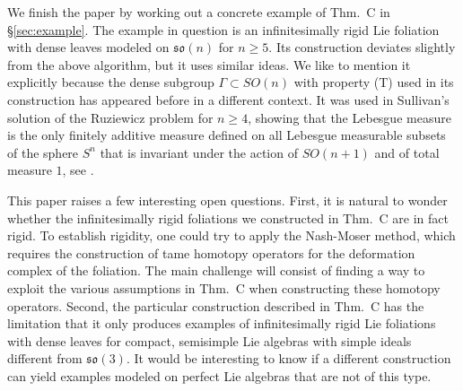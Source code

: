 \documentclass[11pt, letterpaper, oneside,reqno]{amsart}
\theoremstyle{plain}
\theoremstyle{underline}
\theoremstyle{definition}
\theoremstyle{remark}
\begin{document}
	\vspace{0.2cm}
	
	We finish the paper by working out a concrete example of Thm.~C in \S\ref{sec:example}. The example in question is an infinitesimally rigid Lie foliation with dense leaves modeled on $\mathfrak{so}(n)$ for $n\geq 5$. Its construction deviates slightly from the above algorithm, but it uses similar ideas. We like to mention it explicitly because the dense subgroup $\Gamma\subset SO(n)$ with property (T) used in its construction has appeared before in a different context. It was used in Sullivan's solution of the Ruziewicz problem for $n\geq 4$, showing that the Lebesgue measure is the only finitely additive measure defined on all Lebesgue measurable subsets of the sphere $S^{n}$ that is invariant under the action of $SO(n+1)$ and of total measure $1$, see \cite[\S~3.4]{Lubotzky}.
	
	\vspace{0.2cm}
	
	This paper raises a few interesting open questions. First, it is natural to wonder whether the infinitesimally rigid foliations we constructed in Thm.~C are in fact rigid. To establish rigidity, one could try to apply the Nash-Moser method, which requires the construction of tame homotopy operators for the deformation complex of the foliation. The main challenge will consist of finding a way to exploit the various assumptions in Thm.~C when constructing these homotopy operators. Second, the particular construction described in Thm.~C has the limitation that it only produces examples of infinitesimally rigid Lie foliations with dense leaves for compact, semisimple Lie algebras with simple ideals different from $\mathfrak{so(3)}$. It would be interesting to know if a different construction can yield examples modeled on perfect Lie algebras that are not of this type.

	
	
	
\end{document}

